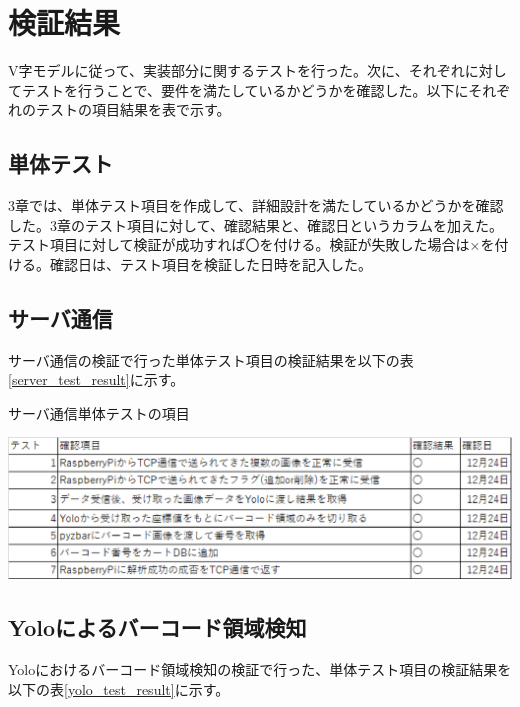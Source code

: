 \section{検証結果}
V字モデルに従って、実装部分に関するテストを行った。次に、それぞれに対してテストを行うことで、要件を満たしているかどうかを確認した。以下にそれぞれのテストの項目結果を表で示す。

\subsection{単体テスト}
3章では、単体テスト項目を作成して、詳細設計を満たしているかどうかを確認した。3章のテスト項目に対して、確認結果と、確認日というカラムを加えた。テスト項目に対して検証が成功すれば〇を付ける。検証が失敗した場合は×を付ける。確認日は、テスト項目を検証した日時を記入した。

\subsection*{サーバ通信}
サーバ通信の検証で行った単体テスト項目の検証結果を以下の表\ref{server_test_result}に示す。%

\begin{table}[htbp]
\centering
\caption{サーバ通信単体テストの項目}
\includegraphics[width=14cm]{./pic/result/server_test_result.eps}
\label{server_test_result}
\end{table}


\subsection*{Yoloによるバーコード領域検知}
Yoloにおけるバーコード領域検知の検証で行った、単体テスト項目の検証結果を以下の表\ref{yolo_test_result}に示す。%


